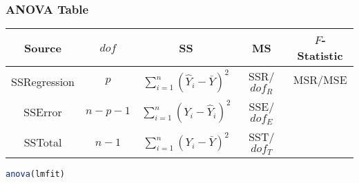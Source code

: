 \subsubsection{ANOVA Table}
    \begin{table}[H]
        \centering
        \renewcommand\arraystretch{1}
        \begin{tabular}{c|cccc}
            \hline
            Source&$ dof $&SS&MS&$ F $-Statistic\\\hline
            SSRegression&$ p $&$ \sum_{i=1}^n(\hat{Y}_i-\bar{Y})^2  $&SSR/$ dof_R $& $ \mathrm{MSR}/\mathrm{MSE} $\\
            SSError&$ n-p-1 $&$ \sum_{i=1}^n(Y_i-\hat{Y}_i)^2  $&SSE/$ dof_E $& \\
            SSTotal&$ n-1 $&$ \sum_{i=1}^n(Y_i-\bar{Y})^2  $&SST/$ dof_T $& \\
            \hline
        \end{tabular}
    \end{table}
\begin{rcode}
    \begin{lstlisting}[language=R]
anova(lmfit)
    \end{lstlisting}
\end{rcode}    





